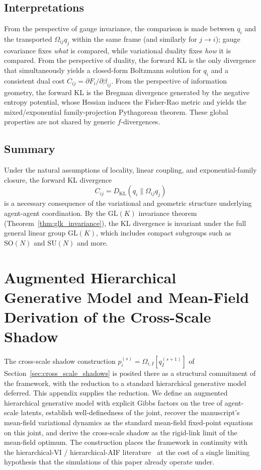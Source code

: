 \documentclass[11pt]{article}
\begin{document}
\subsection*{Interpretations}
From the perspective of gauge invariance, the comparison is made between $q_i$ and the transported $\Omega_{ij}q_j$ within the same frame (and similarly for $j \rightarrow i$); gauge covariance fixes \emph{what} is compared, while variational duality fixes \emph{how} it is compared. From the perspective of duality, the forward KL is the only divergence that simultaneously yields a closed-form Boltzmann solution for $q_i$ and a consistent dual cost $C_{ij} = \partial F_i/\partial\beta_{ij}$. From the perspective of information geometry, the forward KL is the Bregman divergence generated by the negative entropy potential, whose Hessian induces the Fisher-Rao metric and yields the mixed/exponential family-projection Pythagorean theorem. These global properties are not shared by generic $f$-divergences.

\subsection*{Summary}
Under the natural assumptions of locality, linear coupling, and exponential-family closure, the forward KL divergence
\[
\boxed{
C_{ij}=D_{\mathrm{KL}}(q_i \| \Omega_{ij} q_j)}
\]
is a necessary consequence of the variational and geometric structure underlying agent-agent coordination. By the $\mathrm{GL}(K)$ invariance theorem (Theorem~\ref{thm:glk_invariance}), the KL divergence is invariant under the full general linear group $\mathrm{GL}(K)$, which includes compact subgroups such as $\mathrm{SO}(N)$ and $\mathrm{SU}(N)$ and more.

\section{Augmented Hierarchical Generative Model and Mean-Field Derivation of the Cross-Scale Shadow}
\label{app:augmented_joint}

The cross-scale shadow construction $p_i^{(s)} = \Omega_{i,I}[q_I^{(s+1)}]$ of Section~\ref{sec:cross_scale_shadows} is posited there as a structural commitment of the framework, with the reduction to a standard hierarchical generative model deferred. This appendix supplies the reduction. We define an augmented hierarchical generative model with explicit Gibbs factors on the tree of agent-scale latents, establish well-definedness of the joint, recover the manuscript's mean-field variational dynamics as the standard mean-field fixed-point equations on this joint, and derive the cross-scale shadow as the rigid-link limit of the mean-field optimum. The construction places the framework in continuity with the hierarchical-VI / hierarchical-AIF literature~\cite{Friston2017, parr2022active} at the cost of a single limiting hypothesis that the simulations of this paper already operate under.
\end{document}
